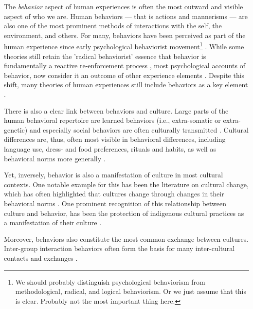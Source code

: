 \documentclass[nobib]{tufte-handout}
\begin{document}
The \textit{behavior} aspect of human experiences is often the most outward and visible aspect of who we are. Human behaviors --- that is actions and mannerisms --- are also one of the most prominent methods of interactions with the self, the environment, and others. For many, behaviors have been perceived as part of the human experience since early psychological behaviorist movement\footnote{We should probably distinguish psychological behaviorism from methodological, radical, and logical behaviorism. Or we just assume that this is clear. Probably not the most important thing here.} \citep[e.g.,][]{Syngg1949}. While some theories still retain the 'radical behaviorist' essence that behavior is fundamentally a reactive re-enforcement process \citep[largely learning and habit theories; e.g.,][]{Hayes2001}, most psychological accounts of behavior, now consider it an outcome of other experience elements \citep[e.g.,][]{Ajzen2019}. Despite this shift, many theories of human experiences still include behaviors as a key element \citep[e.g.,][]{Breckler1984, VanHarreveld2015, Ben-Eliyahu2015}.

There is also a clear link between behaviors and culture. Large parts of the human behavioral repertoire are learned behaviors (i.e., extra-somatic or extra-genetic) and especially social behaviors are often culturally transmitted \citep{Legare2019, Whiting1980}. Cultural differences are, thus, often most visible in behavioral differences, including language use, dress- and food preferences, rituals and habits, as well as behavioral norms more generally \citep[e.g., social norms, as well as formal rules and laws; e.g.,][]{Hofstede2001}. 

Yet, inversely, behavior is also a manifestation of culture in most cultural contexts. One notable example for this has been the literature on cultural change, which has often highlighted that cultures change through changes in their behavioral norms \citep[e.g.,][]{Varnum2017}. One prominent recognition of this relationship between culture and behavior, has been the protection of indigenous cultural practices as a manifestation of their culture \citep[Art. 11]{UnitedNations2007}. 

Moreover, behaviors also constitute the most common exchange between cultures. Inter-group interaction behaviors often form the basis for many inter-cultural contacts and exchanges \citep{Maxwell2017, Sam2010}. 
\end{document}
